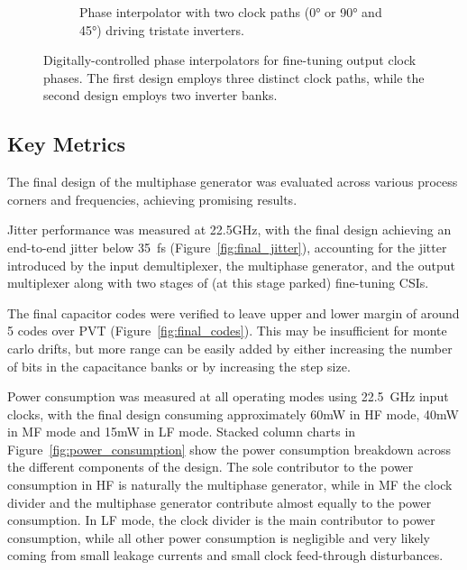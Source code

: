 \begin{figure}[H]
\begin{subfigure}[t]{0.3\linewidth}
    \caption{Phase interpolator with two clock paths (\ang{0} or \ang{90} and \ang{45}) driving tristate inverters.}
    \label{fig:phase_interpolator_2paths}
  \end{subfigure}
  \hfill\null
  \caption{Digitally-controlled phase interpolators for fine-tuning output clock phases. The first design employs three distinct clock paths, while the second design employs two inverter banks.}
  \label{fig:phase_interpolators}
\end{figure}


\subsection{Key Metrics}\label{final_key_metrics}

The final design of the multiphase generator was evaluated across various process corners and frequencies, achieving promising results. 

Jitter performance was measured at 22.5GHz, with the final design achieving an end-to-end jitter below 35~fs (Figure~\ref{fig:final_jitter}), accounting for the jitter introduced by the input demultiplexer, the multiphase generator, and the output multiplexer along with two stages of (at this stage parked) fine-tuning CSIs.

The final capacitor codes were verified to leave upper and lower margin of around 5 codes over PVT (Figure~\ref{fig:final_codes}). This may be insufficient for monte carlo drifts, but more range can be easily added by either increasing the number of bits in the capacitance banks or by increasing the step size.

Power consumption was measured at all operating modes using 22.5~GHz input clocks, with the final design consuming approximately 60mW in HF mode, 40mW in MF mode and 15mW in LF mode. Stacked column charts in Figure~\ref{fig:power_consumption} show the power consumption breakdown across the different components of the design. The sole contributor to the power consumption in HF is naturally the multiphase generator, while in MF the clock divider and the multiphase generator contribute almost equally to the power consumption. In LF mode, the clock divider is the main contributor to power consumption, while all other power consumption is negligible and very likely coming from small leakage currents and small clock feed-through disturbances.

